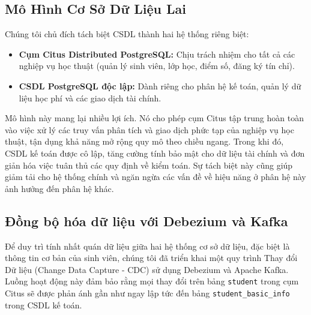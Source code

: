 \documentclass[conference]{IEEEtran}
\begin{document}
\subsection{Mô Hình Cơ Sở Dữ Liệu Lai}
Chúng tôi chủ đích tách biệt CSDL thành hai hệ thống riêng biệt:
\begin{itemize}
    \item \textbf{Cụm Citus Distributed PostgreSQL:} Chịu trách nhiệm cho tất cả các nghiệp vụ học thuật (quản lý sinh viên, lớp học, điểm số, đăng ký tín chỉ).
    \item \textbf{CSDL PostgreSQL độc lập:} Dành riêng cho phân hệ kế toán, quản lý dữ liệu học phí và các giao dịch tài chính.
\end{itemize}
Mô hình này mang lại nhiều lợi ích. Nó cho phép cụm Citus tập trung hoàn toàn vào việc xử lý các truy vấn phân tích và giao dịch phức tạp của nghiệp vụ học thuật, tận dụng khả năng mở rộng quy mô theo chiều ngang. Trong khi đó, CSDL kế toán được cô lập, tăng cường tính bảo mật cho dữ liệu tài chính và đơn giản hóa việc tuân thủ các quy định về kiểm toán. Sự tách biệt này cũng giúp giảm tải cho hệ thống chính và ngăn ngừa các vấn đề về hiệu năng ở phân hệ này ảnh hưởng đến phân hệ khác.

\subsection{Đồng bộ hóa dữ liệu với Debezium và Kafka}
Để duy trì tính nhất quán dữ liệu giữa hai hệ thống cơ sở dữ liệu, đặc biệt là thông tin cơ bản của sinh viên, chúng tôi đã triển khai một quy trình Thay đổi Dữ liệu (Change Data Capture - CDC) sử dụng Debezium và Apache Kafka. Luồng hoạt động này đảm bảo rằng mọi thay đổi trên bảng \texttt{student} trong cụm Citus sẽ được phản ánh gần như ngay lập tức đến bảng \texttt{student\_basic\_info} trong CSDL kế toán.
\end{document}
